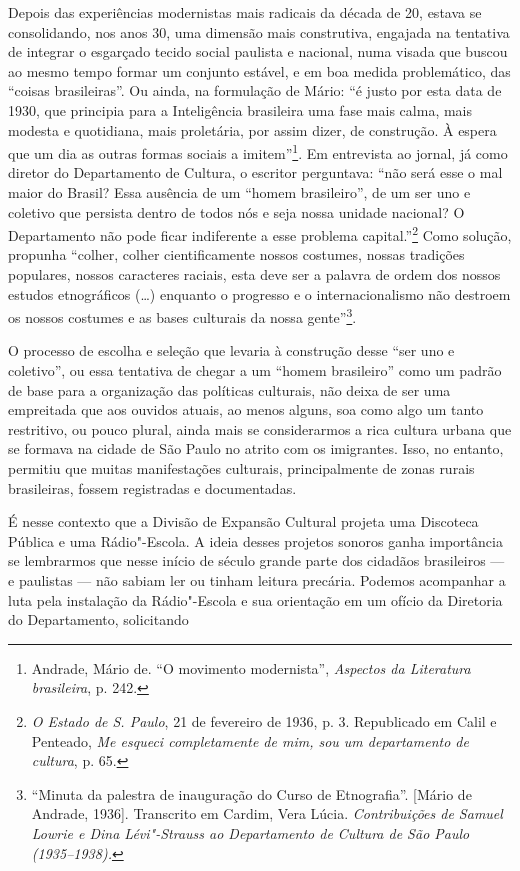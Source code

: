 Depois das experiências modernistas mais radicais da década de 20,
estava se consolidando, nos anos 30, uma dimensão mais construtiva,
engajada na tentativa de integrar o esgarçado tecido social paulista e
nacional, numa visada que buscou ao mesmo tempo formar um conjunto
estável, e em boa medida problemático, das ``coisas brasileiras''. Ou
ainda, na formulação de Mário: ``é justo por esta data de 1930, que
principia para a Inteligência brasileira uma fase mais calma, mais
modesta e quotidiana, mais proletária, por assim dizer, de construção. À
espera que um dia as outras formas sociais a imitem''\footnote{Andrade,
  Mário de. ``O movimento modernista'', \emph{Aspectos da Literatura
  brasileira}, p. 242.}. Em entrevista ao jornal, já como diretor do
Departamento de Cultura, o escritor perguntava: ``não será esse o mal
maior do Brasil? Essa ausência de um ``homem brasileiro'', de um ser uno
e coletivo que persista dentro de todos nós e seja nossa unidade
nacional? O Departamento não pode ficar indiferente a esse problema
capital.''\footnote{\emph{O Estado de S. Paulo}, 21 de fevereiro de
  1936, p. 3. Republicado em Calil e Penteado, \emph{Me esqueci
  completamente de mim, sou um departamento de cultura}, p. 65.} Como
solução, propunha ``colher, colher cientificamente nossos costumes,
nossas tradições populares, nossos caracteres raciais, esta deve ser a
palavra de ordem dos nossos estudos etnográficos (\ldots{}) enquanto o
progresso e o internacionalismo não destroem os nossos costumes e as
bases culturais da nossa gente''\footnote{``Minuta da palestra de
  inauguração do Curso de Etnografia''. {[}Mário de Andrade, 1936{]}.
  Transcrito em Cardim, Vera Lúcia. \emph{Contribuições de Samuel Lowrie
  e Dina Lévi"-Strauss ao Departamento de Cultura de São Paulo (1935--1938).}}.

O processo de escolha e seleção que levaria à construção desse ``ser uno
e coletivo'', ou essa tentativa de chegar a um ``homem brasileiro'' como
um padrão de base para a organização das políticas culturais, não deixa
de ser uma empreitada que aos ouvidos atuais, ao menos alguns, soa como
algo um tanto restritivo, ou pouco plural, ainda mais se considerarmos a
rica cultura urbana que se formava na cidade de São Paulo no atrito com
os imigrantes. Isso, no entanto, permitiu que muitas manifestações
culturais, principalmente de zonas rurais brasileiras, fossem
registradas e documentadas.

É nesse contexto que a Divisão de Expansão Cultural projeta uma
Discoteca Pública e uma Rádio"-Escola. A ideia desses projetos sonoros
ganha importância se lembrarmos que nesse início de século grande parte
dos cidadãos brasileiros --- e paulistas --- não sabiam ler ou tinham
leitura precária. Podemos acompanhar a luta pela instalação da
Rádio"-Escola e sua orientação em um ofício da Diretoria do Departamento,
solicitando

